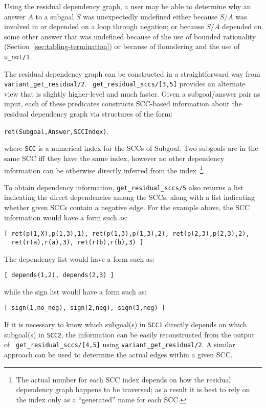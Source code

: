 \begin{description}
%
Using the residual dependency graph, a user may be able to determine
why an answer $A$ to a subgoal $S$ was unexpectedly undefined either
because $S/A$ was involved in or depended on a loop through negation;
or because $S/A$ depended on some other answer that was undefined
because of the use of bounded rationality
(Section~\ref{sec:tabling-termination}) or because of floundering and
the use of {\tt u\_not/1}.  

The residual dependency graph can be constructed in a straightforward
way from {\tt variant\_get\_residual/2}.  {\tt
  get\_residual\_sccs/[3,5]} provides an alternate view that is
slightly higher-level and much faster.  Given a subgoal/answer pair as
input, each of these predicates constructs SCC-based information about
the residual dependency graph via structures of the form:
%
\begin{center}
{\tt ret(Subgoal,Answer,SCCIndex)}.
\end{center}
%
where {\tt SCC} is a numerical index for the SCCs of Subgoal. Two
subgoals are in the same SCC iff they have the same index, however no
other dependency information can be otherwise directly inferred from
the index~\footnote{The actual number for
  each SCC index depends on how the residual dependency graph happens
  to be traversed; as a result it is best to rely on the index only as
  a ``generated'' name for each SCC.}.

To obtain dependency information, {\tt get\_residual\_sccs/5} also returns a
list indicating the direct dependencies among the SCCs, along with a
list indicating whether given SCCs contain a negative edge.  For the
example above, the SCC information would have a form such as:
\begin{verbatim}
[ ret(p(1,X),p(1,3),1), ret(p(1,3),p(1,3),2), ret(p(2,3),p(2,3),2),
  ret(r(a),r(a),3), ret(r(b),r(b),3) ]
\end{verbatim}
%
The dependency list would have a form such as:
\begin{verbatim}
[ depends(1,2), depends(2,3) ]
\end{verbatim}
while the sign list would have a form such as:
\begin{verbatim}
[ sign(1,no_neg), sign(2,neg), sign(3,neg) ]
\end{verbatim}
If it is necessary to know which subgoal(s) in {\tt SCC1} directly
depends on which subgoal(s) in {\tt SCC2}, the information can be
easily reconstructed from the output of {\tt
  get\_residual\_sccs/[4,5]} using {\tt variant\_get\_residual/2}.  A
similar approach can be used to determine the actual edges within a
given SCC.


\end{description}
